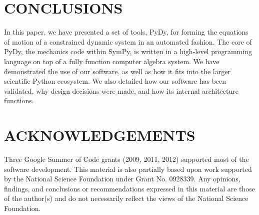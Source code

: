 \documentclass[twocolumn,10pt]{asme2e}
\begin{document}

\section*{CONCLUSIONS}
In this paper, we have presented a set of tools, PyDy, for forming the
equations of motion of a constrained dynamic system in an automated fashion.
The core of PyDy, the mechanics code within SymPy, is written in a high-level
programming language on top of a fully function computer algebra system.
We have demonstrated the use of our software, as well as how it fits into the
larger scientific Python ecosystem.
We also detailed how our software has been validated, why design decisions were
made, and how its internal architecture functions.

\section*{ACKNOWLEDGEMENTS}
Three Google Summer of Code grants (2009, 2011, 2012) supported most of the
software development. This material is also partially based upon work supported
by the National Science Foundation under Grant No. 0928339. Any opinions,
findings, and conclusions or recommendations expressed in this material are
those of the author(s) and do not necessarily reflect the views of the National
Science Foundation.


\end{document}
